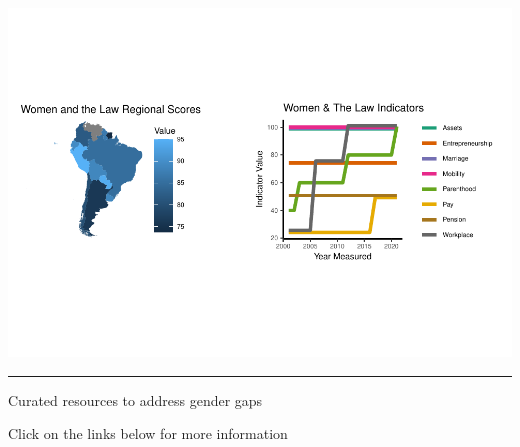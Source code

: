 \documentclass[
]{article}
\begin{document}
\begin{center}\includegraphics[width=1\linewidth,trim={0 3.1cm 0 3.1cm},clip]{Gender-Briefs_files/figure-latex/genderlaw-1} \end{center}

\begin{center}\rule{0.5\linewidth}{0.5pt}\end{center}

\fontsize{14}{8}\selectfont

Curated resources to address gender gaps \normalsize

Click on the links below for more information
\end{document}
